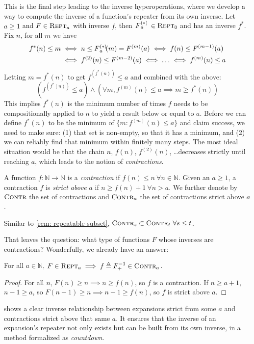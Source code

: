 This is the final step leading to the inverse hyperoperations, where we develop a way to compute the inverse of a function's repeater from its own inverse. Let $a\ge 1$ and $F\in \text{\scshape{Rept}}_a$ with inverse $f$, then $\rf{F}{a}\ \in \repeatable_0$ and has an inverse $f^*$. Fix $n$, for all $m$ we have
\begin{equation} \label{eq: rf-upp-inv}
\begin{aligned}
f^*(n)\le m & \iff n\le \rf{F}{a}(m) = F^{(m)}(a) \iff f(n)\le F^{(m-1)}(a) \\
& \iff f^{(2)}(n)\le F^{(m-2)}(a) \iff \ldots \iff f^{(m)}(n)\le a
\end{aligned}
\end{equation}
Letting $m = f^*(n)$ to get $f^{(f^*(n))}\le a$ and combined with the above:
\begin{equation*}
\left(f^{(f^*(n))} \le a \right) \wedge \left( \forall m, f^{(m)}(n)\le a \implies m \ge f^*(n) \right)
\end{equation*}
This implies $f^*(n)$ is the minimum number of times $f$ needs to be compositionally applied to $n$ to yield a result below or equal to $a$. Before we can define $f^*(n)$ to be the minimum of $\{m: f^{(m)}(n)\le a \}$ and claim success, we need to make sure: (1) that set is non-empty, so that it has a minimum, and (2) we can reliably find that minimum within finitely many steps. The most ideal situation would be that the chain $n$, $f(n)$, $f^{(2)}(n)$, \ldots decreases strictly until reaching $a$, which leads to the notion of \emph{contractions}.
\begin{defn} \label{defn: contracting}
	A function $f : \mathbb{N} \to \mathbb{N}$ is a \textit{contraction} if $f(n) \le n \ \forall n\in \mathbb{N}$. Given an $a \ge 1$, a contraction $f$ is \textit{strict above} $a$ if $n\ge f(n)+1 \ \forall n > a$. We further denote by $\text{\scshape{Contr}}$ the set of contractions and $\text{\scshape{Contr}}_a$ the set of contractions strict above $a$.
\end{defn}
\begin{rem}
	Similar to \cref{rem: repeatable-subset}, $\text{\scshape{Contr}}_s \subset \text{\scshape{Contr}}_t \ \forall s\le t$.
\end{rem}
That leaves the question: what type of functions $F$ whose inverses are contractions? Wonderfully, we already have an answer:
\begin{thm} \label{thm: expansion-inv-contraction}
For all $a\in \mathbb{N}$, $F\in \text{\scshape{Rept}}_a \implies f\triangleq F^{-1}_+\in \text{\scshape{Contr}}_a$.
\end{thm}
\begin{proof}
For all $n$, $F(n)\ge n \implies n \ge f(n)$, so $f$ is a contraction. If $n\ge a+1$, $n-1\ge a$, so $F(n-1)\ge n \implies n-1\ge f(n)$, so $f$ is strict above $a$.
\end{proof}
 shows a clear inverse relationship between expansions strict from some $a$ and contractions strict above that same $a$. It ensures that the inverse of an expansion's repeater not only exists but can be built from its own inverse, in a method formalized as \emph{countdown}.

